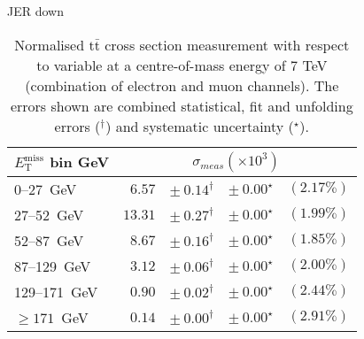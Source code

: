 \documentclass{article}
\newcommand{\ttbar}{\ensuremath{\text{t}\bar{\text{t}}}\xspace}
\newcommand{\GeV}{GeV}
\begin{document}
JER down
\begin{table}[H]
\setlength{\tabcolsep}{2pt}
\centering
\caption{Normalised \ttbar cross section measurement with respect to \MET variable
at a centre-of-mass energy of 7 TeV (combination of electron and muon channels). The errors shown are combined statistical, fit and unfolding errors ($^\dagger$) and systematic uncertainty ($^\star$).}
\label{tab:MET_xsections_7TeV_JER_down_combined}
\begin{tabular}{lrrrr}
\hline
$E_{\mathrm{T}}^{\mathrm{miss}}$ bin GeV & \multicolumn{4}{c}{$\sigma_{meas} \left(\times 10^{3}\right)$}\\ 
\hline
0--27~\GeV &  $6.57$ & $ \pm~ 0.14^\dagger$ & $ \pm~ 0.00^\star$ & $(2.17\%)$\\ 
27--52~\GeV &  $13.31$ & $ \pm~ 0.27^\dagger$ & $ \pm~ 0.00^\star$ & $(1.99\%)$\\ 
52--87~\GeV &  $8.67$ & $ \pm~ 0.16^\dagger$ & $ \pm~ 0.00^\star$ & $(1.85\%)$\\ 
87--129~\GeV &  $3.12$ & $ \pm~ 0.06^\dagger$ & $ \pm~ 0.00^\star$ & $(2.00\%)$\\ 
129--171~\GeV &  $0.90$ & $ \pm~ 0.02^\dagger$ & $ \pm~ 0.00^\star$ & $(2.44\%)$\\ 
$\geq 171$~\GeV &  $0.14$ & $ \pm~ 0.00^\dagger$ & $ \pm~ 0.00^\star$ & $(2.91\%)$\\ 
\hline 
\end{tabular}
\end{table}
\end{document}
